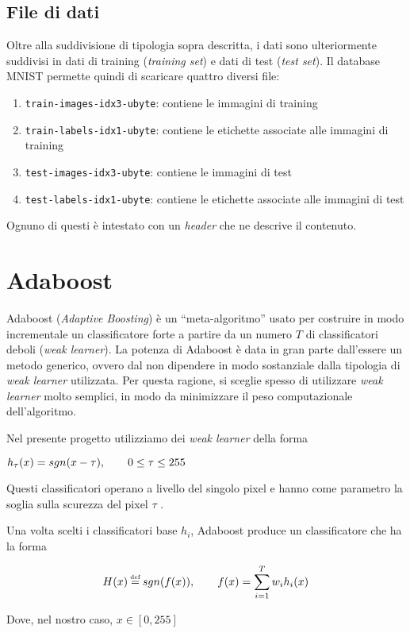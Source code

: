 \documentclass[12pt, letterpaper]{article}
\newcommand\eqdef{\mathrel{\stackrel{\makebox[0pt]{\mbox{\normalfont\tiny def}}}{=}}}
\begin{document}
\subsection{File di dati}
 Oltre alla suddivisione di tipologia sopra descritta, i dati sono ulteriormente suddivisi in dati di training ({\it training set}) e dati di test ({\it test set}). 
 Il database MNIST permette quindi di scaricare quattro diversi file:
\begin{enumerate}
	\item {\tt train-images-idx3-ubyte}: contiene le immagini di training
	\item {\tt train-labels-idx1-ubyte}: contiene le etichette associate alle immagini di training
	\item {\tt test-images-idx3-ubyte}: contiene le immagini di test
	\item {\tt test-labels-idx1-ubyte}: contiene le etichette associate alle immagini di test
\end{enumerate}
Ognuno di questi \`e intestato con un {\it header} che ne descrive il contenuto.


\section{Adaboost}
Adaboost ({\it Adaptive Boosting}) \`e un ``meta-algoritmo'' usato per costruire in modo incrementale un classificatore forte a partire da un numero $T$ di classificatori deboli ({\it weak learner}). La potenza di Adaboost \`e data in gran parte dall'essere un metodo generico, ovvero dal non dipendere in modo sostanziale dalla tipologia di {\it weak learner} utilizzata. Per questa ragione, si sceglie spesso di utilizzare {\it weak learner} molto semplici, in modo da minimizzare il peso computazionale dell'algoritmo.

Nel presente progetto utilizziamo dei {\it weak learner} della forma
\begin{center}
	\( h_\tau(x) = sgn(x - \tau), \hskip 2em 0 \le \tau \le 255 \)
\end{center}
Questi classificatori operano a livello del singolo pixel e hanno come parametro la soglia sulla scurezza del pixel $\tau$ .

Una volta scelti i classificatori base \({h_i}\), Adaboost produce un classificatore che ha la forma
\begin{center}
	\[ H(x) \eqdef sgn(f(x)), \hskip 2em f(x) = {\huge \sum\limits_{i=1}^T{w_i h_i(x)}} \]
\end{center}
Dove, nel nostro caso, \( x \in [0, 255] \) %
\end{document}
